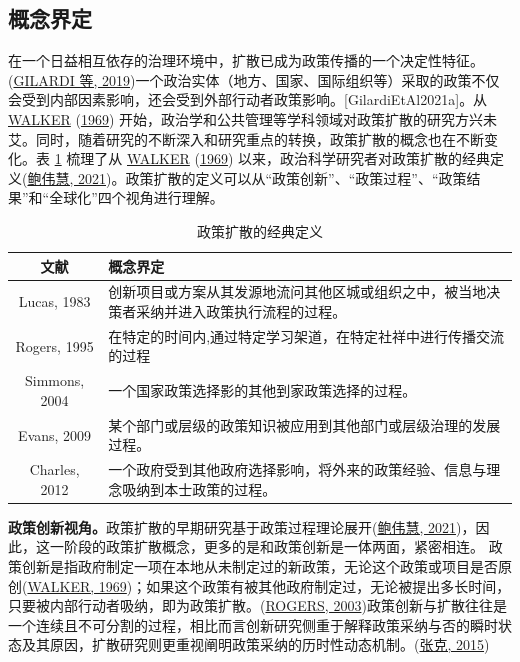 \documentclass[
  12pt,
]{ctexart}
\begin{document}
\hypertarget{ux6982ux5ff5ux754cux5b9a}{%
\subsection{概念界定}\label{ux6982ux5ff5ux754cux5b9a}}

在一个日益相互依存的治理环境中，扩散已成为政策传播的一个决定性特征。(\protect\hyperlink{ref-GilardiWasserfallen2019}{GILARDI 等, 2019})一个政治实体（地方、国家、国际组织等）采取的政策不仅会受到内部因素影响，还会受到外部行动者政策影响。{[}GilardiEtAl2021a{]}。从 \protect\hyperlink{ref-Walker1969}{WALKER} (\protect\hyperlink{ref-Walker1969}{1969}) 开始，政治学和公共管理等学科领域对政策扩散的研究方兴未艾。同时，随着研究的不断深入和研究重点的转换，政策扩散的概念也在不断变化。表 \ref{tab:definition} 梳理了从 \protect\hyperlink{ref-Walker1969}{WALKER} (\protect\hyperlink{ref-Walker1969}{1969}) 以来，政治科学研究者对政策扩散的经典定义(\protect\hyperlink{ref-BaoWeiHui2021}{鲍伟慧, 2021})。政策扩散的定义可以从``政策创新''、``政策过程''、``政策结果''和``全球化''四个视角进行理解。

\begin{table}[!h]

\caption{\label{tab:definition}政策扩散的经典定义}
\centering
\begin{tabular}[t]{c>{\centering\arraybackslash}p{30em}}
\toprule
文献 & 概念界定\\
\midrule
Lucas, 1983 & 创新项目或方案从其发源地流问其他区城或组织之中，被当地决策者采纳并进入政策执行流程的过程。\\
Rogers, 1995 & 在特定的时间内,通过特定学习架道，在特定社祥中进行传播交流的过程\\
Simmons, 2004 & 一个国家政策选择影的其他到家政策选择的过程。\\
Evans, 2009 & 某个部门或层级的政策知识被应用到其他部门或层级治理的发展过程。\\
Charles, 2012 & 一个政府受到其他政府选择影响，将外来的政策经验、信息与理念吸纳到本士政策的过程。\\
\bottomrule
\end{tabular}
\end{table}

\textbf{政策创新视角。}政策扩散的早期研究基于政策过程理论展开(\protect\hyperlink{ref-BaoWeiHui2021}{鲍伟慧, 2021})，因此，这一阶段的政策扩散概念，更多的是和政策创新是一体两面，紧密相连。
政策创新是指政府制定一项在本地从未制定过的新政策，无论这个政策或项目是否原创(\protect\hyperlink{ref-Walker1969}{WALKER, 1969})；如果这个政策有被其他政府制定过，无论被提出多长时间，只要被内部行动者吸纳，即为政策扩散。(\protect\hyperlink{ref-Rogers2003}{ROGERS, 2003})政策创新与扩散往往是一个连续且不可分割的过程，相比而言创新研究侧重于解释政策采纳与否的瞬时状态及其原因，扩散研究则更重视阐明政策采纳的历时性动态机制。(\protect\hyperlink{ref-ZhangKe2015}{张克, 2015})
\end{document}
